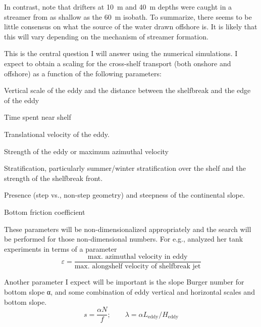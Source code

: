 In contrast, \cite{Brink2003} note that drifters at \SI{10}{\m} and \SI{40}{\m} depths were caught in a streamer from as shallow as the \SI{60}{m} isobath. To summarize, there seems to be little consensus on what the source of the water drawn offshore is. It is likely that this will vary depending on the mechanism of streamer formation.


This is the central question I will answer using the numerical simulations. I expect to obtain a scaling for the cross-shelf transport (both onshore and offshore) as a function of the following parameters:
\setlength{\plitemsep}{1pt}
\begin{compactitem}
\item Vertical scale of the eddy  and the distance between the shelfbreak and the edge of the eddy
\item Time spent near shelf
\item Translational velocity of the eddy.
\item Strength of the eddy or maximum azimuthal velocity
\item Stratification, particularly summer/winter stratification over the shelf and the strength of the shelfbreak front.
\item Presence (step vs., non-step geometry) and steepness of the continental slope.
\item Bottom friction coefficient
\end{compactitem} 

These parameters will be non-dimensionalized appropriately and the search will be performed for those non-dimensional numbers. For e.g., \cite{Cenedese2012} analyzed her tank experiments in terms of a parameter
\begin{equation}
 ε = \frac{\text{max. azimuthal velocity in eddy}}{\text{max. alongshelf velocity of shelfbreak jet}}
 \label{eq:eps}
\end{equation}

Another parameter I expect will be important is the slope Burger number for bottom slope α, and some combination of eddy vertical and horizontal scales and bottom slope.
\begin{equation}
s = \frac{αN}{f} \label{eq:slope}; \qquad λ = αL_\text{eddy}/H_\text{eddy}
\end{equation} 

